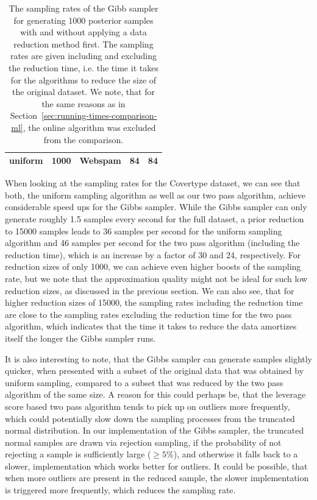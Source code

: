 \begin{table}[ht!]
\begin{tabular}{ l | l| l| l| l}
        uniform         & 1000          & Webspam          & 84                                  & 84  \\ \hline
    \end{tabular}
    \caption{The sampling rates of the Gibb sampler for
        generating 1000 posterior samples with and without applying a data
        reduction method first.
        The sampling rates are given including and excluding the
        reduction time, i.e. the time it takes for the algorithms
        to reduce the size of the original dataset.
        We note, that for the same reasons as in
        Section~\ref{sec:running-times-comparison-ml}, the
        online algorithm was excluded from the comparison.}
    \label{tab:running-times-bayes}
\end{table}

When looking at the sampling rates for the Covertype dataset, we can
see that both, the uniform sampling algorithm as well as our
two pass algorithm, achieve considerable speed ups for the Gibbs
sampler. While the Gibbs sampler can only generate roughly
1.5 samples every second for the full dataset, a prior reduction
to 15000 samples leads to 36 samples per second for the uniform
sampling algorithm and 46 samples per second for the two pass
algorithm (including the reduction time),
which is an increase by a factor of 30 and 24, respectively.
For reduction sizes of only 1000, we can achieve even higher
boosts of the sampling rate, but we note that the approximation
quality might not be ideal for such low reduction sizes, as
discussed in the previous section.
We can also see, that for higher reduction sizes of 15000, the
sampling rates including the reduction time are close to the
sampling rates excluding the reduction time for the two pass
algorithm, which indicates that the time it takes to reduce the
data amortizes itself the longer the Gibbs sampler runs.

It is also interesting to note, that the Gibbs sampler can generate
samples slightly quicker, when presented with a subset of the
original data that was obtained
by uniform sampling, compared to a subset that was reduced by
the two pass algorithm of the same size.
A reason for this could perhaps be, that the leverage score based
two pass algorithm tends to pick up on outliers more frequently,
which could potentially slow down the sampling processes from
the truncated normal distribution.
In our implementation of the Gibbs sampler, the truncated normal
samples are drawn via rejection sampling, if the probability of
not rejecting a sample is sufficiently large ($\geq 5\%$), and otherwise
it falls back to a slower, implementation which works better for
outliers. It could be possible, that when more outliers are present
in the reduced sample, the slower implementation is triggered more
frequently, which reduces the sampling rate.

